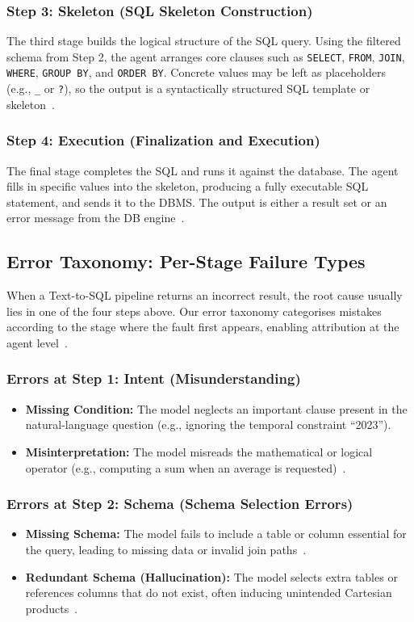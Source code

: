\documentclass[conference]{IEEEtran}
\begin{document}
\subsubsection{Step 3: Skeleton (SQL Skeleton Construction)}
The third stage builds the logical structure of the SQL query. Using the
filtered schema from Step 2, the agent arranges core clauses such as
\texttt{SELECT}, \texttt{FROM}, \texttt{JOIN}, \texttt{WHERE},
\texttt{GROUP BY}, and \texttt{ORDER BY}. Concrete values may be left as
placeholders (e.g., \texttt{\_} or \texttt{?}), so the output is a
syntactically structured SQL template or skeleton~\cite{lei_emlc_2026}.

\subsubsection{Step 4: Execution (Finalization and Execution)}
The final stage completes the SQL and runs it against the database. The
agent fills in specific values into the skeleton, producing a fully
executable SQL statement, and sends it to the DBMS. The output is either a
result set or an error message from the DB engine~\cite{yu_spider_2018}.

\subsection{Error Taxonomy: Per-Stage Failure Types}
When a Text-to-SQL pipeline returns an incorrect result, the root cause
usually lies in one of the four steps above. Our error taxonomy categorises
mistakes according to the stage where the fault first appears, enabling
attribution at the agent level~\cite{shen_icl_errors_2026}.

\subsubsection{Errors at Step 1: Intent (Misunderstanding)}
\begin{itemize}
  \item \textbf{Missing Condition:} The model neglects an important clause
  present in the natural-language question (e.g., ignoring the temporal
  constraint ``2023'').
  \item \textbf{Misinterpretation:} The model misreads the mathematical or
  logical operator (e.g., computing a sum when an average is requested)~\cite{shen_icl_errors_2026}.
\end{itemize}

\subsubsection{Errors at Step 2: Schema (Schema Selection Errors)}
\begin{itemize}
  \item \textbf{Missing Schema:} The model fails to include a table or column
  essential for the query, leading to missing data or invalid join
  paths~\cite{chang_drspider_2023}.
  \item \textbf{Redundant Schema (Hallucination):} The model selects extra
  tables or references columns that do not exist, often inducing unintended
  Cartesian products~\cite{lei_emlc_2026}.
\end{itemize}
\end{document}

